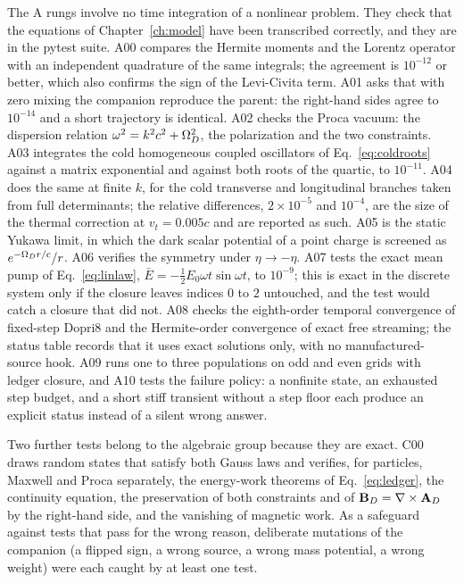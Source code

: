 The A rungs involve no time integration of a nonlinear problem. They check that the equations of Chapter~\ref{ch:model} have been transcribed correctly, and they are in the pytest suite. A00 compares the Hermite moments and the Lorentz operator with an independent quadrature of the same integrals; the agreement is $10^{-12}$ or better, which also confirms the sign of the Levi-Civita term. A01 asks that with zero mixing the companion reproduce the parent: the right-hand sides agree to $10^{-14}$ and a short trajectory is identical. A02 checks the Proca vacuum: the dispersion relation $\omega^2=k^2c^2+\Omega_D^2$, the polarization and the two constraints. A03 integrates the cold homogeneous coupled oscillators of Eq.~\eqref{eq:coldroots} against a matrix exponential and against both roots of the quartic, to $10^{-11}$. A04 does the same at finite $k$, for the cold transverse and longitudinal branches taken from full determinants; the relative differences, $2\times10^{-5}$ and $10^{-4}$, are the size of the thermal correction at $v_t=0.005c$ and are reported as such. A05 is the static Yukawa limit, in which the dark scalar potential of a point charge is screened as $e^{-\Omega_D r/c}/r$. A06 verifies the symmetry under $\eta\to-\eta$. A07 tests the exact mean pump of Eq.~\eqref{eq:linlaw}, $\bar E=-\tfrac12E_0\omega t\sin\omega t$, to $10^{-9}$; this is exact in the discrete system only if the closure leaves indices $0$ to $2$ untouched, and the test would catch a closure that did not. A08 checks the eighth-order temporal convergence of fixed-step Dopri8 and the Hermite-order convergence of exact free streaming; the status table records that it uses exact solutions only, with no manufactured-source hook. A09 runs one to three populations on odd and even grids with ledger closure, and A10 tests the failure policy: a nonfinite state, an exhausted step budget, and a short stiff transient without a step floor each produce an explicit status instead of a silent wrong answer.

Two further tests belong to the algebraic group because they are exact. C00 draws random states that satisfy both Gauss laws and verifies, for particles, Maxwell and Proca separately, the energy-work theorems of Eq.~\eqref{eq:ledger}, the continuity equation, the preservation of both constraints and of $\mathbf{B}_D=\nabla\times\mathbf{A}_D$ by the right-hand side, and the vanishing of magnetic work. As a safeguard against tests that pass for the wrong reason, deliberate mutations of the companion (a flipped sign, a wrong source, a wrong mass potential, a wrong weight) were each caught by at least one test.

